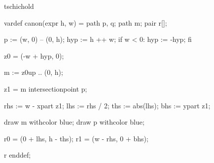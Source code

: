 %
%
%



\startenvironment tschichold

	\startMPdefinitions
		vardef canon(expr h, w) =
			path p, q;
			path m;
			pair r[];

			p := (w, 0) -- (0, h); %
			hyp := h ++ w; %
			if w < 0:
				hyp := -hyp;
			fi

			z0 = (-w + hyp, 0); %

			m := z0{up} .. (0, h);

			z1 = m intersectionpoint p;

			rhs := w - xpart z1;
			lhs := rhs / 2;
			ths := abs(lhs); %
			bhs := ypart z1;

			draw m withcolor blue;
			draw p withcolor blue;

			r0 = (0 + lhs, h - ths); %
			r1 = (w - rhs, 0 + bhs); %

			r
		enddef;
	\stopMPdefinitions

\stopenvironment


